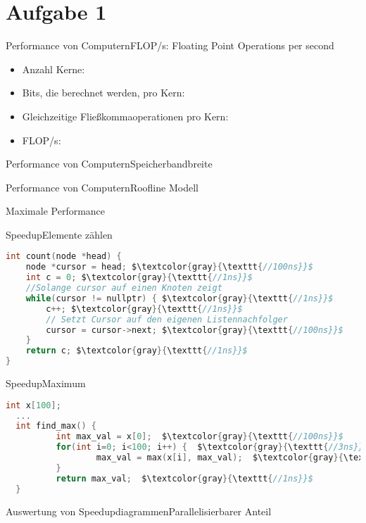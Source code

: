 \documentclass[
  german,            %
  aspectratio=169,    %
  sectionpage=false,   %
]{tumbeamer}
\begin{document}
\section{Aufgabe 1}
\begin{frame}{Performance von Computern}{FLOP/s: Floating Point Operations per second}
  \begin{itemize}
    \item Anzahl Kerne:
    \item Bits, die berechnet werden, pro Kern:
    \item Gleichzeitige Fließkommaoperationen pro Kern:
    \item FLOP/s:
  \end{itemize}
\end{frame}
\begin{frame}{Performance von Computern}{Speicherbandbreite}
\end{frame}
\begin{frame}{Performance von Computern}{Roofline Modell}
\end{frame}
\begin{frame}{Maximale Performance}
\end{frame}
\begin{frame}[fragile]{Speedup}{Elemente zählen}
\begin{lstlisting}[language=C, mathescape]
int count(node *head) {
    node *cursor = head; $\textcolor{gray}{\texttt{//100ns}}$
    int c = 0; $\textcolor{gray}{\texttt{//1ns}}$
    //Solange cursor auf einen Knoten zeigt
    while(cursor != nullptr) { $\textcolor{gray}{\texttt{//1ns}}$
        c++; $\textcolor{gray}{\texttt{//1ns}}$
        // Setzt Cursor auf den eigenen Listennachfolger
        cursor = cursor->next; $\textcolor{gray}{\texttt{//100ns}}$
    }
    return c; $\textcolor{gray}{\texttt{//1ns}}$
}
\end{lstlisting}
\end{frame}
\begin{frame}[fragile]{Speedup}{Maximum}
\begin{lstlisting}[language=C, mathescape]
  int x[100];
  ...
  int find_max() {
          int max_val = x[0];  $\textcolor{gray}{\texttt{//100ns}}$
          for(int i=0; i<100; i++) {  $\textcolor{gray}{\texttt{//3ns}}$
                  max_val = max(x[i], max_val);  $\textcolor{gray}{\texttt{//17ns}}$
          }
          return max_val;  $\textcolor{gray}{\texttt{//1ns}}$
  }
  \end{lstlisting}
\end{frame}
\begin{frame}{Auswertung von Speedupdiagrammen}{Parallelisierbarer Anteil}
\end{frame}
\end{document}
